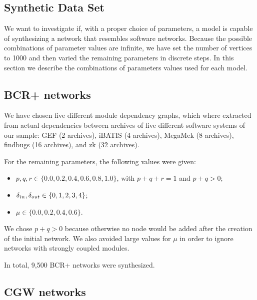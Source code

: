 \subsection{Synthetic Data Set}

We want to investigate if, with a proper choice of parameters, a model is
capable of synthesizing a network that resembles software networks. Because the
possible combinations of parameter values are infinite, we have set the number
of vertices to 1000 and then varied the remaining parameters in discrete steps.
In this section we describe the combinations of parameters values used for each
model.

\subsection{BCR+ networks}

We have chosen five different module dependency graphs, which where extracted
from actual dependencies between archives of five different software systems of
our sample: GEF (2 archives), iBATIS (4 archives), MegaMek (8 archives),
findbugs (16 archives), and zk (32 archives). 

For the remaining parameters, the following values were given:

\begin{itemize}
\item $p, q, r \in \{0.0, 0.2, 0.4, 0.6, 0.8, 1.0\}$, with $p + q + r = 1$ and
$p + q > 0$;
\item $\delta_{in}, \delta_{out} \in \{0, 1, 2, 3, 4\}$;
\item $\mu \in \{0.0, 0.2, 0.4, 0.6\}$.
\end{itemize}

We chose $p + q > 0$ because otherwise no node would be added after the
creation of the initial network. We also avoided large values for $\mu$ in
order to ignore networks with strongly coupled modules. 

In total, 9,500 BCR+ networks were synthesized.

\subsection{CGW networks}

